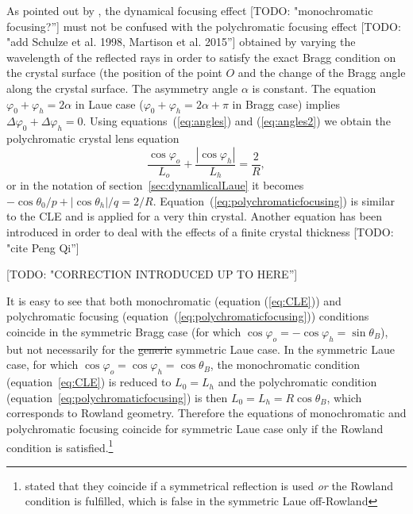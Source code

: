 \documentclass[preprint]{iucr}              %
\newcommand{\todo}[1]{{\color{red}[TODO: "#1'']}}
\begin{document}
As pointed out by \cite{CK}, the dynamical focusing effect \todo{monochromatic focusing?} must not be confused with the polychromatic focusing effect \cite{handbook} \todo{add Schulze et al. 1998, Martison et al. 2015} obtained by varying the wavelength of the reflected rays in order to satisfy the exact Bragg condition on the crystal surface (the position of the point $O$ and the change of the Bragg angle along the crystal surface. The asymmetry angle $\alpha$ is constant. The equation $\varphi_0+\varphi_h=2\alpha$ in Laue case ($\varphi_0+\varphi_h=2\alpha+\pi$ in Bragg case) implies $\Delta\varphi_0+\Delta\varphi_h=0$. Using equations~(\ref{eq:angles}) and  (\ref{eq:angles2}) we obtain the polychromatic crystal lens equation
\begin{equation}
\label{eq:polychromaticfocusing}
\frac{{\cos {\varphi _o}}}{{{L_o}}} + \frac{{\left| {\cos {\varphi _h}} \right|}}{{{L_h}}} = \frac{2}{R},
\end{equation}
or in the notation of section~\ref{sec:dynamlicalLaue} it becomes $-\cos\theta_0/p + |\cos\theta_h|/q=2/R$. Equation~(\ref{eq:polychromaticfocusing}) is similar to the CLE and is applied for a very thin crystal. Another equation has been introduced in order to deal with the effects of a finite crystal thickness \todo{cite Peng Qi}

\todo{CORRECTION INTRODUCED UP TO HERE}

It is easy to see that both monochromatic (equation (\ref{eq:CLE})) and polychromatic focusing (equation~(\ref{eq:polychromaticfocusing})) conditions coincide in the symmetric Bragg case (for which $\cos\varphi_o=-\cos\varphi_h=\sin\theta_B$), but not necessarily for the \sout{generic} symmetric Laue case. In the symmetric Laue case, for which $\cos\varphi_o=\cos\varphi_h=\cos\theta_B$, the monochromatic condition (equation~\ref{eq:CLE}) is reduced to $L_0=L_h$ and the polychromatic condition (equation~\ref{eq:polychromaticfocusing}) is then $L_0=L_h=R\cos\theta_B$, which corresponds to Rowland geometry. Therefore the equations of monochromatic and polychromatic focusing coincide for symmetric Laue case only if the Rowland condition is satisfied.\footnote{\cite{CK} stated that they coincide if a symmetrical reflection is used {\it or} the Rowland condition is fulfilled, which is false in the symmetric Laue off-Rowland}
\end{document}
